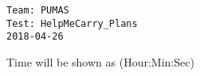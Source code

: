 \documentclass{article}
\begin{document}
\begin{center}
\begingroup
\fontsize{16pt}{17pt}\selectfont
\begin{BVerbatim}
Team: PUMAS
Test: HelpMeCarry_Plans
2018-04-26
\end{BVerbatim}
\endgroup 
\end{center}
\begingroup
\fontsize{9pt}{9pt}\selectfont
\begin{quoting}[indentfirst=true]
\hspace*{\fill} Time will be shown as (Hour:Min:Sec)\\
\end{quoting}
\endgroup
\end{document}
